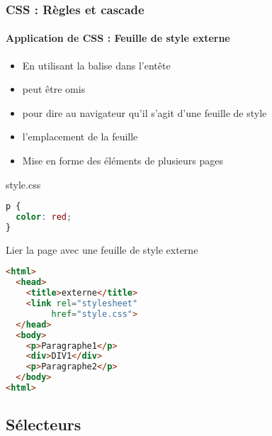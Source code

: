 \documentclass[xcolor=table]{beamer}
\begin{document}
\begin{frame}[fragile]
\frametitle{CSS : Règles et cascade}
\framesubtitle{Application de CSS : Feuille de style externe}

\begin{minipage}{0.60\textwidth} 
	\begin{itemize}
		\item En utilisant la balise  dans l'entête
		\item {} peut être omis
		\item {} pour dire au navigateur qu'il s'agit d'une feuille de style
		\item {} l'emplacement de la feuille
		\item Mise en forme des éléments de plusieurs pages 
	\end{itemize}
\begin{minipage}{0.95\textwidth} 
\begin{exampleblock}{style.css}
	\lstset{escapeinside=**}
	\scriptsize\bfseries\vspace{-6pt}
\begin{lstlisting}[language={CSS}]
p {
  color: red;
}
\end{lstlisting}\vspace{-6pt}
\end{exampleblock}
\end{minipage}
\end{minipage}
%
\begin{minipage}{0.38\textwidth}
\begin{exampleblock}{Lier la page avec une feuille de style externe}
\lstset{escapeinside=**}
\scriptsize\bfseries
\begin{lstlisting}[language={html}]
<html>
  <head>
    <title>externe</title>
    <link rel="stylesheet" 
         href="style.css">
  </head>
  <body>
    <p>Paragraphe1</p>
    <div>DIV1</div>
    <p>Paragraphe2</p>
  </body>
<html>
\end{lstlisting}
\end{exampleblock}
\end{minipage}

\end{frame}

\subsection{Sélecteurs}
\end{document}
